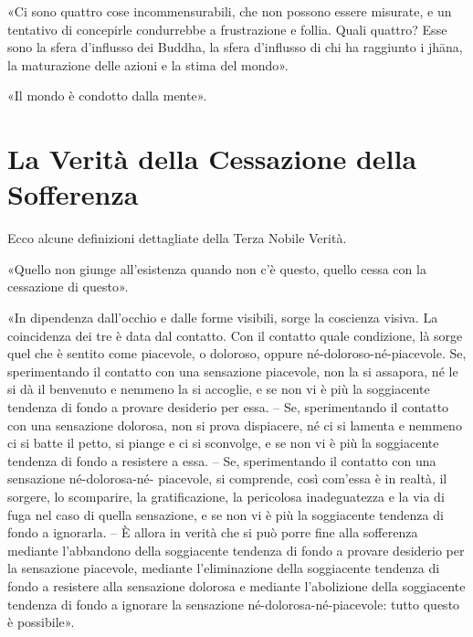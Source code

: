 
«Ci sono quattro cose incommensurabili, che non possono essere misurate, e un
tentativo di concepirle condurrebbe a frustrazione e follia. Quali quattro? Esse
sono la sfera d’influsso dei Buddha, la sfera d’influsso di chi ha raggiunto i
jhāna, la maturazione delle azioni e la stima del mondo».


«Il mondo è condotto dalla mente».


\section*{La Verità della Cessazione della Sofferenza}

 Ecco alcune definizioni dettagliate della Terza
Nobile Verità.

 «Quello non giunge all’esistenza quando non c’è questo,
quello cessa con la cessazione di questo».


«In dipendenza dall’occhio e dalle forme visibili, sorge la coscienza visiva. La
coincidenza dei tre è data dal contatto. Con il contatto quale condizione, là
sorge quel che è sentito come piacevole, o doloroso, oppure
né-doloroso-né-piacevole. Se, sperimentando il contatto con una sensazione
piacevole, non la si assapora, né le si dà il benvenuto e nemmeno la si
accoglie, e se non vi è più la soggiacente tendenza di fondo a provare desiderio
per essa. – Se, sperimentando il contatto con una sensazione dolorosa, non si
prova dispiacere, né ci si lamenta e nemmeno ci si batte il petto, si piange e
ci si sconvolge, e se non vi è più la soggiacente tendenza di fondo a resistere
a essa. – Se, sperimentando il contatto con una sensazione né-dolorosa-né-
piacevole, si comprende, così com’essa è in realtà, il sorgere, lo scomparire,
la gratificazione, la pericolosa inadeguatezza e la via di fuga nel caso di
quella sensazione, e se non vi è più la soggiacente tendenza di fondo a
ignorarla. – È allora in verità che si può porre fine alla sofferenza mediante
l’abbandono della soggiacente tendenza di fondo a provare desiderio per la
sensazione piacevole, mediante l’eliminazione della soggiacente tendenza di
fondo a resistere alla sensazione dolorosa e mediante l’abolizione della
soggiacente tendenza di fondo a ignorare la sensazione né-dolorosa-né-piacevole:
tutto questo è possibile».

